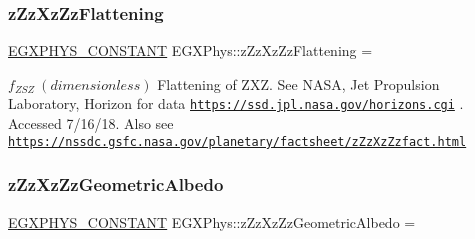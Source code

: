 \subsubsection{\texorpdfstring{z\+Zz\+Xz\+Zz\+Flattening}{zZzXzZzFlattening}}
{\footnotesize\ttfamily \mbox{\hyperlink{group___e_g_x_phys-_constants-_macros_ga76980d288494ce1714c9ac68a95ba702}{E\+G\+X\+P\+H\+Y\+S\+\_\+\+C\+O\+N\+S\+T\+A\+NT}} E\+G\+X\+Phys\+::z\+Zz\+Xz\+Zz\+Flattening =}

$f_{ZSZ} \ (dimensionless)$ Flattening of Z\+XZ. See N\+A\+SA, Jet Propulsion Laboratory, Horizon for data \href{https://ssd.jpl.nasa.gov/horizons.cgi}{\tt https\+://ssd.\+jpl.\+nasa.\+gov/horizons.\+cgi} . Accessed 7/16/18. Also see \href{https://nssdc.gsfc.nasa.gov/planetary/factsheet/zZzXzZzfact.html}{\tt https\+://nssdc.\+gsfc.\+nasa.\+gov/planetary/factsheet/z\+Zz\+Xz\+Zzfact.\+html} \mbox{\label{group___e_g_x_phys-_constants-_astrophysics-_solar_system-_z_x_z-_bulk_ga5dbefc602a8bb7b902b0c6e32844dd21}} 
\subsubsection{\texorpdfstring{z\+Zz\+Xz\+Zz\+Geometric\+Albedo}{zZzXzZzGeometricAlbedo}}
{\footnotesize\ttfamily \mbox{\hyperlink{group___e_g_x_phys-_constants-_macros_ga76980d288494ce1714c9ac68a95ba702}{E\+G\+X\+P\+H\+Y\+S\+\_\+\+C\+O\+N\+S\+T\+A\+NT}} E\+G\+X\+Phys\+::z\+Zz\+Xz\+Zz\+Geometric\+Albedo =}

